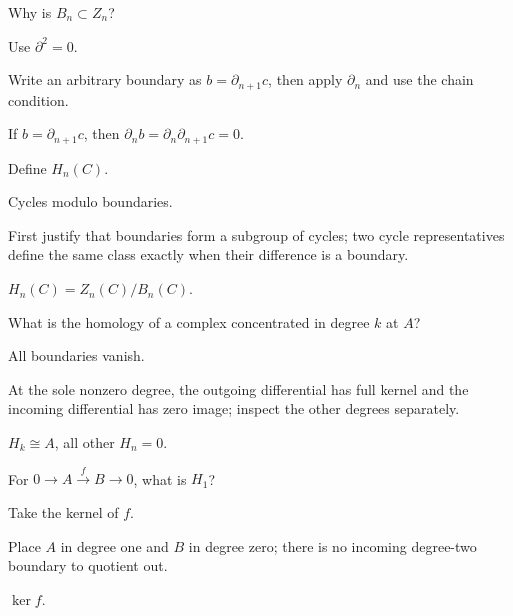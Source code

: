 \begin{exercise}\label{exr:viii16-04}
Why is \(B_n\subset Z_n\)?
\end{exercise}
\begin{hint}
Use \(\partial^2=0\).

Write an arbitrary boundary as \(b=\partial_{n+1}c\), then apply \(\partial_n\) and use the chain condition.
\end{hint}
\begin{solution}
If \(b=\partial_{n+1}c\), then \(\partial_nb=\partial_n\partial_{n+1}c=0\).
\end{solution}

\begin{exercise}\label{exr:viii16-05}
Define \(H_n(C)\).
\end{exercise}
\begin{hint}
Cycles modulo boundaries.

First justify that boundaries form a subgroup of cycles; two cycle representatives define the same class exactly when their difference is a boundary.
\end{hint}
\begin{solution}
\(H_n(C)=Z_n(C)/B_n(C)\).
\end{solution}

\begin{exercise}\label{exr:viii16-06}
What is the homology of a complex concentrated in degree \(k\) at \(A\)?
\end{exercise}
\begin{hint}
All boundaries vanish.

At the sole nonzero degree, the outgoing differential has full kernel and the incoming differential has zero image; inspect the other degrees separately.
\end{hint}
\begin{solution}
\(H_k\cong A\), all other \(H_n=0\).
\end{solution}

\begin{exercise}\label{exr:viii16-07}
For \(0\to A\xrightarrow f B\to0\), what is \(H_1\)?
\end{exercise}
\begin{hint}
Take the kernel of \(f\).

Place \(A\) in degree one and \(B\) in degree zero; there is no incoming degree-two boundary to quotient out.
\end{hint}
\begin{solution}
\(\ker f\).
\end{solution}

